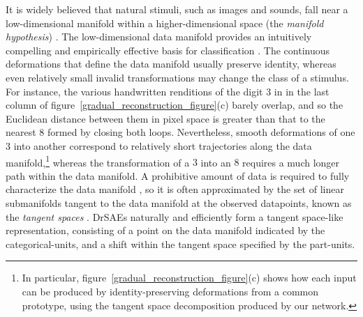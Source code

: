 \documentclass{article} %
\begin{document}
It is widely believed that natural stimuli, such as images and sounds, fall near a low-dimensional manifold within a higher-dimensional space (the \emph{manifold hypothesis}) \citep{lee2003, olshausen2004, bengio2012}.  %
The low-dimensional data manifold provides an intuitively compelling and empirically effective basis for classification \citep{simard1993, simard1998, rifai2011b}.  The continuous deformations that define the data manifold usually preserve identity, whereas even relatively small invalid transformations may change the class of a stimulus.  For instance, the various handwritten renditions of the digit $3$ in in the last column of figure~\ref{gradual_reconstruction_figure}(c) barely overlap, and so the Euclidean distance between them in pixel space is greater than that to the nearest $8$ formed by closing both loops.  Nevertheless, smooth deformations of one $3$ into another correspond to relatively short trajectories along the data manifold,\footnote{In particular, figure~\ref{gradual_reconstruction_figure}(c) shows how each input can be produced by identity-preserving deformations from a common prototype, using the tangent space decomposition produced by our network.} whereas the transformation of a $3$ into an $8$ requires a much longer path within the data manifold.  
A prohibitive amount of data is required to fully characterize the data manifold \citep{narayanan2010}, so it is often approximated by the set of linear submanifolds tangent to the data manifold at the observed datapoints, known as the \emph{tangent spaces} \citep{simard1998, rifai2011b, ekanadham2011}.  %
DrSAEs naturally and efficiently form a tangent space-like representation, consisting of a point on the data manifold indicated by the categorical-units, and a shift within the tangent space specified by the part-units.  %
\end{document}
